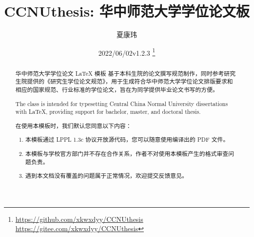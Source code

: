 \documentclass{ccnudoc}
\title{\textcolor{MaterialIndigo800}{%
  \textbf{CCNUthesis: 华中师范大学学位论文\xpinyin[font=\sffamily,format=\color{MaterialIndigo800}]{模}{mu2}板}}}
\author{夏康玮}
\date{2022/06/02\quad v1.2.3%
  \thanks{%
    \parbox{0.5\textwidth}{
      \url{https://github.com/xkwxdyy/CCNUthesis} \\
      \url{https://gitee.com/xkwxdyy/CCNUthesis}
    }
  }
}
\begin{document}

\maketitle

\begin{abstract}
华中师范大学学位论文 \LaTeX{} 模板  基于本科生院的论文撰写规范制作，同时参考研究生院提供的《研究生学位论文规范》，用于生成符合华中师范大学学位论文排版要求和相应的国家规范、行业标准的学位论文，旨在为同学提供毕业论文书写的方便。
\end{abstract}

\def\abstractname{Abstract}
\begin{abstract}
The  class is intended for typesetting Central China Normal University dissertations with \LaTeX{}, providing support for bachelor, master, and doctoral thesis.
\end{abstract}

\vspace{2cm}
\def\abstractname{特别声明}
\begin{abstract}
在使用本模板时，我们默认您同意以下内容：
\begin{enumerate}
  \item 本模板通过 LPPL 1.3c 协议开放源代码，您可以随意使用编译出的 PDF 文件。
  \item 本模板与学校官方部门并不存在合作关系，作者不对使用本模板产生的格式审查问题负责。
  \item 遇到本文档没有覆盖的问题属于正常情况，欢迎提交反馈意见。
\end{enumerate}
\end{abstract}
\end{document}
